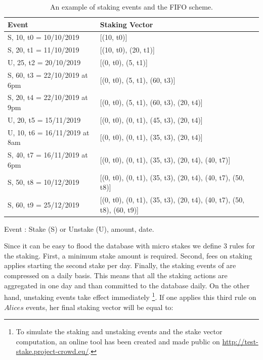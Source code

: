 \documentclass[]{article}
\begin{document}
\begin{table}[]
\centering
\begin{threeparttable}
\begin{tabular}{|l|p{8cm}|}
\hline
Event & Staking Vector \\
\hline
S, 10, t0 = 10/10/2019 & [(10, t0)]\\
S, 20, t1 = 11/10/2019 & [(10, t0), (20, t1)]\\
U, 25, t2 = 20/10/2019 & [(0, t0), (5, t1)]\\
S, 60, t3 = 22/10/2019 at 6pm  & [(0, t0), (5, t1), (60, t3)]\\
S, 20, t4 = 22/10/2019 at 9pm & [(0, t0), (5, t1), (60, t3), (20, t4)]\\
U, 20, t5 = 15/11/2019 & [(0, t0), (0, t1), (45, t3), (20, t4)]\\
U, 10, t6 = 16/11/2019 at 8am & [(0, t0), (0, t1), (35, t3), (20, t4)]\\
S, 40, t7 = 16/11/2019 at 6pm & [(0, t0), (0, t1), (35, t3), (20, t4), (40, t7)]\\
S, 50, t8 = 10/12/2019 & [(0, t0), (0, t1), (35, t3), (20, t4), (40, t7), (50, t8)]\\
S, 60, t9 = 25/12/2019 & [(0, t0), (0, t1), (35, t3), (20, t4), (40, t7), (50, t8), (60, t9)]\\
\hline
\end{tabular}
\begin{tablenotes}
\centering
      \small
      \item Event : Stake (S) or Unstake (U), amount, date.
    \end{tablenotes}
 \end{threeparttable}
 \caption{An example of staking events and the FIFO scheme.}
\label{tab:stakeex}
\end{table}

Since it can be easy to flood the database with micro stakes we define 3 rules for the staking. First, a minimum stake amount is required. Second, fees on staking applies starting the second stake per day. Finally, the staking events of are compressed on a daily basis. This means that all the staking actions are aggregated in one day and than committed to the database daily. On the other hand, unstaking events take effect immediately \footnote{ To simulate the staking and unstaking events and the stake vector computation, an online tool has been created and made public on \url{http://test-stake.project-crowd.eu/}.}. If one applies this third rule on $Alices$ events, her final staking vector will be equal to: 
\end{document}
